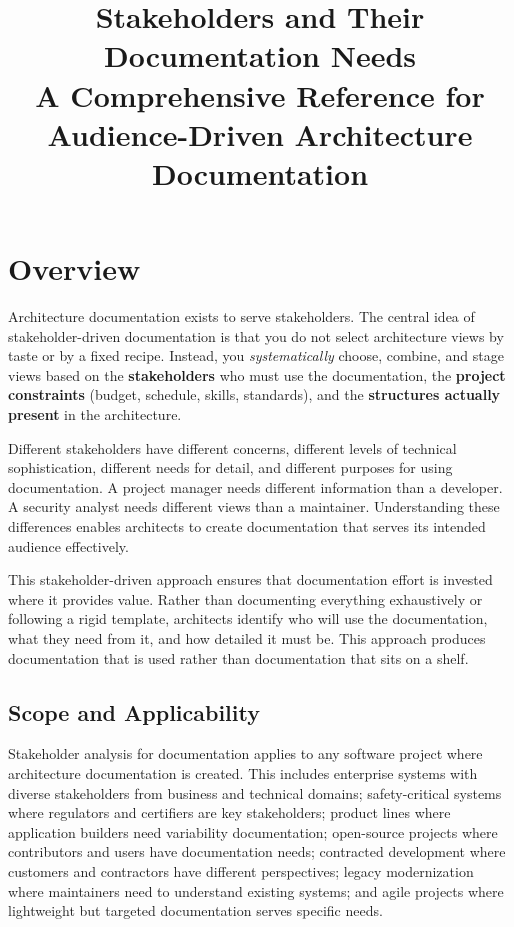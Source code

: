 \documentclass[11pt]{article}
\begin{document}
\title{\textbf{Stakeholders and Their Documentation Needs}\\[0.5em]
\large A Comprehensive Reference for Audience-Driven Architecture Documentation}
\author{}
\date{}
\maketitle

\tableofcontents
\newpage

\section{Overview}

Architecture documentation exists to serve stakeholders. The central idea of stakeholder-driven documentation is that you do not select architecture views by taste or by a fixed recipe. Instead, you \emph{systematically} choose, combine, and stage views based on the \textbf{stakeholders} who must use the documentation, the \textbf{project constraints} (budget, schedule, skills, standards), and the \textbf{structures actually present} in the architecture.

Different stakeholders have different concerns, different levels of technical sophistication, different needs for detail, and different purposes for using documentation. A project manager needs different information than a developer. A security analyst needs different views than a maintainer. Understanding these differences enables architects to create documentation that serves its intended audience effectively.

This stakeholder-driven approach ensures that documentation effort is invested where it provides value. Rather than documenting everything exhaustively or following a rigid template, architects identify who will use the documentation, what they need from it, and how detailed it must be. This approach produces documentation that is used rather than documentation that sits on a shelf.

\subsection{Scope and Applicability}

Stakeholder analysis for documentation applies to any software project where architecture documentation is created. This includes enterprise systems with diverse stakeholders from business and technical domains; safety-critical systems where regulators and certifiers are key stakeholders; product lines where application builders need variability documentation; open-source projects where contributors and users have documentation needs; contracted development where customers and contractors have different perspectives; legacy modernization where maintainers need to understand existing systems; and agile projects where lightweight but targeted documentation serves specific needs.
\end{document}
